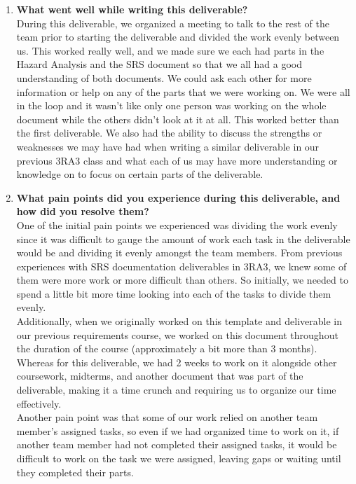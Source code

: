 \begin{enumerate}
  \item \textbf{What went well while writing this deliverable?} \\ 
  During this deliverable, we organized a meeting to talk to the rest of the team prior to starting the deliverable and divided the work evenly between us. This worked really well, and we made sure we each had parts in the Hazard Analysis and the SRS document so that we all had a good understanding of both documents. We could ask each other for more information or help on any of the parts that we were working on. We were all in the loop and it wasn’t like only one person was working on the whole document while the others didn’t look at it at all. This worked better than the first deliverable. We also had the ability to discuss the strengths or weaknesses we may have had when writing a similar deliverable in our previous 3RA3 class and what each of us may have more understanding or knowledge on to focus on certain parts of the deliverable.

  \item \textbf{What pain points did you experience during this deliverable, and how did you resolve them?} \\ 
  One of the initial pain points we experienced was dividing the work evenly since it was difficult to gauge the amount of work each task in the deliverable would be and dividing it evenly amongst the team members. From previous experiences with SRS documentation deliverables in 3RA3, we knew some of them were more work or more difficult than others. So initially, we needed to spend a little bit more time looking into each of the tasks to divide them evenly.\\
  Additionally, when we originally worked on this template and deliverable in our previous requirements course, we worked on this document throughout the duration of the course (approximately a bit more than 3 months). Whereas for this deliverable, we had 2 weeks to work on it alongside other coursework, midterms, and another document that was part of the deliverable, making it a time crunch and requiring us to organize our time effectively.\\
  Another pain point was that some of our work relied on another team member’s assigned tasks, so even if we had organized time to work on it, if another team member had not completed their assigned tasks, it would be difficult to work on the task we were assigned, leaving gaps or waiting until they completed their parts.


\end{enumerate}
